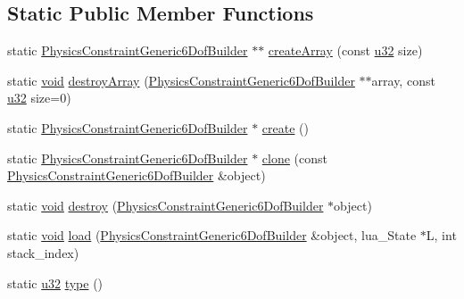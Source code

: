 \subsection*{Static Public Member Functions}
\begin{DoxyCompactItemize}
\item 
static \mbox{\hyperlink{classnjli_1_1_physics_constraint_generic6_dof_builder}{Physics\+Constraint\+Generic6\+Dof\+Builder}} $\ast$$\ast$ \mbox{\hyperlink{classnjli_1_1_physics_constraint_generic6_dof_builder_a7b06ac114aa1fbcc704133290fec5b3c}{create\+Array}} (const \mbox{\hyperlink{_util_8h_a10e94b422ef0c20dcdec20d31a1f5049}{u32}} size)
\item 
static \mbox{\hyperlink{_thread_8h_af1e856da2e658414cb2456cb6f7ebc66}{void}} \mbox{\hyperlink{classnjli_1_1_physics_constraint_generic6_dof_builder_a9fa41019822ee43f0769bb52e29cf488}{destroy\+Array}} (\mbox{\hyperlink{classnjli_1_1_physics_constraint_generic6_dof_builder}{Physics\+Constraint\+Generic6\+Dof\+Builder}} $\ast$$\ast$array, const \mbox{\hyperlink{_util_8h_a10e94b422ef0c20dcdec20d31a1f5049}{u32}} size=0)
\item 
static \mbox{\hyperlink{classnjli_1_1_physics_constraint_generic6_dof_builder}{Physics\+Constraint\+Generic6\+Dof\+Builder}} $\ast$ \mbox{\hyperlink{classnjli_1_1_physics_constraint_generic6_dof_builder_aaf3fe91011bb96d8b6dc0cfb79c23625}{create}} ()
\item 
static \mbox{\hyperlink{classnjli_1_1_physics_constraint_generic6_dof_builder}{Physics\+Constraint\+Generic6\+Dof\+Builder}} $\ast$ \mbox{\hyperlink{classnjli_1_1_physics_constraint_generic6_dof_builder_a98be0309bcc91621a6cc38f9ca01b6f7}{clone}} (const \mbox{\hyperlink{classnjli_1_1_physics_constraint_generic6_dof_builder}{Physics\+Constraint\+Generic6\+Dof\+Builder}} \&object)
\item 
static \mbox{\hyperlink{_thread_8h_af1e856da2e658414cb2456cb6f7ebc66}{void}} \mbox{\hyperlink{classnjli_1_1_physics_constraint_generic6_dof_builder_a90ceb1fa858b5d4231c40e6cf9f2f563}{destroy}} (\mbox{\hyperlink{classnjli_1_1_physics_constraint_generic6_dof_builder}{Physics\+Constraint\+Generic6\+Dof\+Builder}} $\ast$object)
\item 
static \mbox{\hyperlink{_thread_8h_af1e856da2e658414cb2456cb6f7ebc66}{void}} \mbox{\hyperlink{classnjli_1_1_physics_constraint_generic6_dof_builder_a3ea0eb8b8a34159c1190d6c7f1b176cb}{load}} (\mbox{\hyperlink{classnjli_1_1_physics_constraint_generic6_dof_builder}{Physics\+Constraint\+Generic6\+Dof\+Builder}} \&object, lua\+\_\+\+State $\ast$L, int stack\+\_\+index)
\item 
static \mbox{\hyperlink{_util_8h_a10e94b422ef0c20dcdec20d31a1f5049}{u32}} \mbox{\hyperlink{classnjli_1_1_physics_constraint_generic6_dof_builder_a834578ee471490e8b274e22cf21642fb}{type}} ()
\end{DoxyCompactItemize}
